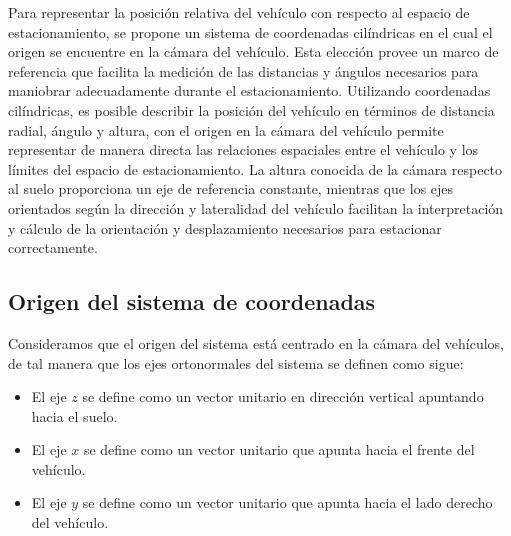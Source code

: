   Para  representar la  posición  relativa  del vehículo  con
respecto  al espacio  de  estacionamiento, se  propone  un sistema  de
coordenadas cilíndricas en el cual el origen se encuentre en la cámara
del vehículo. Esta elección provee un marco de referencia que facilita
la  medición de  las distancias  y ángulos  necesarios para  maniobrar
adecuadamente  durante   el  estacionamiento.
 Utilizando coordenadas cilíndricas,  es posible describir la
posición  del  vehículo en  términos  de  distancia radial,  ángulo  y
altura, con el origen en la cámara del vehículo permite representar de
manera  directa las  relaciones  espaciales entre  el  vehículo y  los
límites  del espacio  de  estacionamiento. La  altura  conocida de  la
cámara respecto al  suelo proporciona un eje  de referencia constante,
mientras que los ejes orientados  según la dirección y lateralidad del
vehículo facilitan  la interpretación  y cálculo  de la  orientación y
desplazamiento necesarios para estacionar correctamente.

\subsection{Origen del sistema de coordenadas}
Consideramos que el origen del sistema está centrado en la cámara del vehículos, de tal manera que los ejes ortonormales del sistema se definen como sigue:
\begin{itemize}
    \item El eje $z$ se define como un vector unitario en dirección vertical  apuntando hacia el suelo.
    \item El eje $x$ se define como un vector unitario que apunta hacia el frente del vehículo.
    \item El eje $y$ se define como un vector unitario que apunta hacia el lado derecho del vehículo.
\end{itemize}

